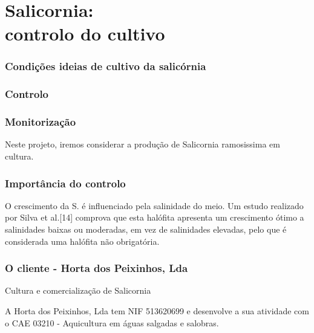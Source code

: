 \chapter{Salicornia:\\ controlo do cultivo}

\subsection{Condições ideias de cultivo da salicórnia}

\subsection{Controlo}

\subsection{Monitorização}




Neste projeto, iremos considerar a produção de Salicornia ramosissima em cultura.



\subsection{Importância do controlo}


O crescimento da S.  é influenciado pela salinidade do meio. Um
estudo realizado por Silva et al.[14] comprova que esta halófita apresenta um crescimento
ótimo a salinidades baixas ou moderadas, em vez de salinidades elevadas, pelo que é
considerada uma halófita não obrigatória.


\subsection{O cliente - Horta dos Peixinhos, Lda}


Cultura e comercialização de Salicornia


A Horta dos Peixinhos, Lda tem NIF 513620699 e desenvolve a sua atividade com o CAE 03210 - Aquicultura em águas salgadas e salobras.





\section{}


